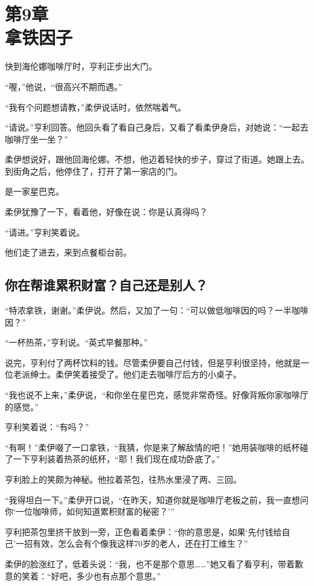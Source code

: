 \section[第9章\q 拿铁因子]{第9章\\ 拿铁因子}
\label{sec:ch9}

快到海伦娜咖啡厅时，亨利正步出大门。

“喔，”他说，“很高兴不期而遇。”

“我有个问题想请教，”柔伊说话时，依然喘着气。

“请说。”亨利回答。他回头看了看自己身后，又看了看柔伊身后，对她说：“一起去咖啡厅坐一坐？”

柔伊想说好，跟他回海伦娜。不想，他迈着轻快的步子，穿过了街道。她跟上去。到街角之后，他停住了，打开了第一家店的门。

是一家星巴克。

柔伊犹豫了一下，看着他，好像在说：你是认真得吗？

“请进。”亨利笑着说。

他们走了进去，来到点餐柜台前。

\subsection{你在帮谁累积财富？自己还是别人？}

“特浓拿铁，谢谢。”柔伊说。然后，又加了一句：“可以做低咖啡因的吗？一半咖啡因？”

“一杯热茶，”亨利说。“英式早餐那种。”

说完，亨利付了两杯饮料的钱。尽管柔伊要自己付钱，但是亨利很坚持，他就是一位老派绅士。柔伊笑着接受了。他们走去咖啡厅后方的小桌子。

“我也说不上来，”柔伊说，“和你坐在星巴克，感觉非常奇怪。好像背叛你家咖啡厅的感觉。”

亨利笑着说：“有吗？”

“有啊！”柔伊啜了一口拿铁，“我猜，你是来了解敌情的吧！”她用装咖啡的纸杯碰了一下亨利装着热茶的纸杯，“耶！我们现在成功卧底了。”

亨利脸上的笑颇为神秘。他拉着茶包，往热水里浸了两、三回。

“我得坦白一下。”柔伊开口说，“在昨天，知道你就是咖啡厅老板之前，我一直想问你‘一位咖啡师，如何知道累积财富的秘密？’”

亨利把茶包里挤干放到一旁，正色看着柔伊：“你的意思是，如果‘先付钱给自己’一招有效，怎么会有个像我这样70岁的老人，还在打工维生？”

柔伊的脸涨红了，低着头说：“我，也不是那个意思……”她又看了看亨利，带着歉意的笑着：“好吧，多少也有点那个意思。”

